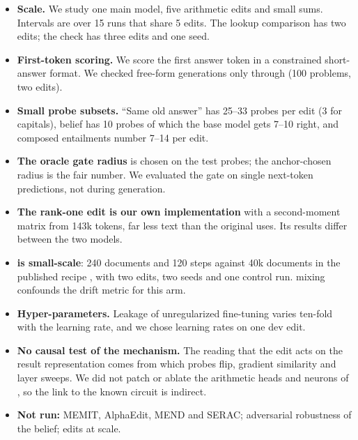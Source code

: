 \begin{itemize}[leftmargin=*,itemsep=0pt,topsep=0pt]
    \item \textbf{Scale.} We study one main model, five arithmetic edits and small sums. Intervals are over 15 runs that share 5 edits. The lookup comparison has two edits; the \qwenshort check has three edits and one seed.
    \item \textbf{First-token scoring.} We score the first answer token in a constrained short-answer format. We checked free-form generations only through \gsm (100 problems, two edits).
    \item \textbf{Small probe subsets.} ``Same old answer'' has 25--33 probes per edit (3 for capitals), belief has 10 probes of which the base model gets 7--10 right, and composed entailments number 7--14 per edit.
    \item \textbf{The oracle gate radius} is chosen on the test probes; the anchor-chosen radius is the fair number. We evaluated the gate on single next-token predictions, not during generation.
    \item \textbf{The rank-one edit is our own implementation} with a second-moment matrix from 143k tokens, far less text than the original uses. Its results differ between the two models.
    \item \textbf{\sdf is small-scale}: 240 documents and 120 steps against 40k documents in the published recipe \citep{slocum2025believe}, with two edits, two seeds and one control run. \wikitext mixing confounds the \wikitext drift metric for this arm.
    \item \textbf{Hyper-parameters.} Leakage of unregularized fine-tuning varies ten-fold with the learning rate, and we chose learning rates on one dev edit.
    \item \textbf{No causal test of the mechanism.} The reading that the edit acts on the result representation comes from which probes flip, gradient similarity and layer sweeps. We did not patch or ablate the arithmetic heads and neurons of \citet{nikankin2025arithmetic}, so the link to the known circuit is indirect.
    \item \textbf{Not run:} MEMIT, AlphaEdit, MEND and SERAC; adversarial robustness of the belief; edits at scale.
\end{itemize}
